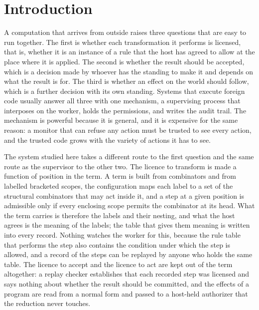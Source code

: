 \documentclass[11pt]{article}
\theoremstyle{definition}
\theoremstyle{remark}
\begin{document}
\begin{abstract}
keeps. The confluence of the safe scope constructor is open, and the proof offered for the settled constructor is a paper proof that has not been reviewed.
\end{abstract}

\tableofcontents

\section{Introduction}

A computation that arrives from outside raises three questions that are easy to run together. The first is whether each transformation it performs is licensed, that is, whether it is an instance of a rule that the host has agreed to allow at the place where it is applied. The second is whether the result should be accepted, which is a decision made by whoever has the standing to make it and depends on what the result is for. The third is whether an effect on the world should follow, which is a further decision with its own standing. Systems that execute foreign code usually answer all three with one mechanism, a supervising process that interposes on the worker, holds the permissions, and writes the audit trail. The mechanism is powerful because it is general, and it is expensive for the same reason: a monitor that can refuse any action must be trusted to see every action, and the trusted code grows with the variety of actions it has to see.

The system studied here takes a different route to the first question and the same route as the supervisor to the other two. The licence to transform is made a function of position in the term. A term is built from combinators and from labelled bracketed scopes, the configuration maps each label to a set of the structural combinators that may act inside it, and a step at a given position is admissible only if every enclosing scope permits the combinator at its head. What the term carries is therefore the labels and their nesting, and what the host agrees is the meaning of the labels; the table that gives them meaning is written into every record. Nothing watches the worker for this, because the rule table that performs the step also contains the condition under which the step is allowed, and a record of the steps can be replayed by anyone who holds the same table. The licence to accept and the licence to act are kept out of the term altogether: a replay checker establishes that each recorded step was licensed and says nothing about whether the result should be committed, and the effects of a program are read from a normal form and passed to a host-held authorizer that the reduction never touches.
\end{document}
